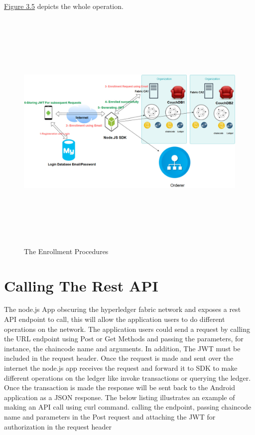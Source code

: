 \hyperref[fig:enrollmentproc]{Figure 3.5} depicts the whole operation.  
\ \\
 \begin{figure}[H]
\includegraphics[width=15cm,height=12cm]{images/enrollmentproc.jpg}
\caption{The Enrollment Procedures}
\label{fig:enrollmentproc}
\end{figure}

  
\section{Calling The Rest API}

The node.js App obscuring the hyperledger fabric network and exposes a rest API endpoint to call, this will allow the application users to do different operations on the network. 
The application users could send a request by calling the URL endpoint using Post or Get Methods and passing the parameters, for instance, the chaincode name and arguments. In addition, The JWT must be included in the request header. Once the request is made and sent over the internet the node.js app receives the request and forward it to SDK to make different operations on the ledger like invoke transactions or querying  the ledger. 
Once the transaction is made the response will be sent back to the Android application as a JSON response. The below listing illustrates an example of making an API call using curl command. calling the endpoint, passing chaincode name and parameters in the Post request and attaching the JWT for authorization in the request header   

